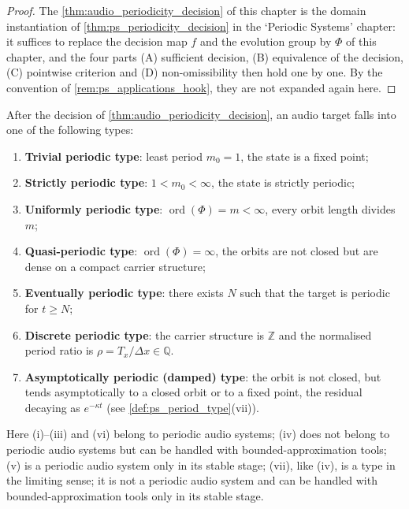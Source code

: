 \begin{proof}
The \cref{thm:audio_periodicity_decision} of this chapter is the domain instantiation of \cref{thm:ps_periodicity_decision} in the `Periodic Systems' chapter:
it suffices to replace the decision map $f$ and the evolution group by $\Phi$ of this chapter, and the four parts (A) sufficient decision, (B) equivalence of the decision, (C) pointwise criterion and
(D) non-omissibility then hold one by one. By the convention of \cref{rem:ps_applications_hook}, they are not expanded again here.
\end{proof}

\begin{corollary}\label{cor:audio_period_type}
After the decision of \cref{thm:audio_periodicity_decision}, an audio target falls into one of the following types:
\begin{enumerate}[label=(\roman*)]
    \item \textbf{Trivial periodic type}: least period $m_0=1$, the state is a fixed point;
    \item \textbf{Strictly periodic type}: $1<m_0<\infty$, the state is strictly periodic;
    \item \textbf{Uniformly periodic type}: $\operatorname{ord}(\Phi)=m<\infty$, every orbit length divides $m$;
    \item \textbf{Quasi-periodic type}: $\operatorname{ord}(\Phi)=\infty$, the orbits are not closed but are dense on a compact carrier structure;
    \item \textbf{Eventually periodic type}: there exists $N$ such that the target is periodic for $t\ge N$;
    \item \textbf{Discrete periodic type}: the carrier structure is $\mathbb Z$ and the normalised period ratio is $\rho=T_x/\Delta x\in\mathbb Q$.
    \item \textbf{Asymptotically periodic (damped) type}: the orbit is not closed, but tends asymptotically to a closed orbit or to a fixed point, the residual decaying as $e^{-\kappa t}$ (see \cref{def:ps_period_type}(vii)).
\end{enumerate}
Here (i)--(iii) and (vi) belong to periodic audio systems; (iv) does not belong to periodic audio systems but can be handled with bounded-approximation tools; (v) is a periodic audio system only in its stable stage; (vii), like (iv), is a type in the limiting sense; it is not a periodic audio system and can be handled with bounded-approximation tools only in its stable stage.
\end{corollary}

